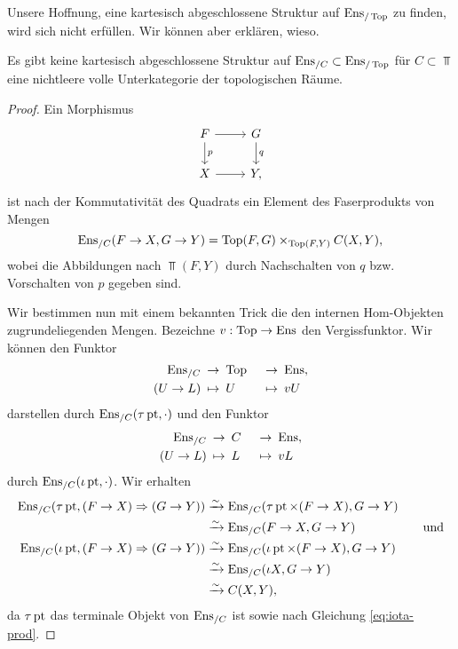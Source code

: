 Unsere Hoffnung, eine kartesisch abgeschlossene Struktur auf
$\operatorname{Ens}_{/\operatorname{Top}}$ zu finden, wird sich nicht erfüllen. Wir können aber
erklären, wieso.

\begin{satz}
  Es gibt keine kartesisch abgeschlossene Struktur auf
  $\operatorname{Ens}_{/C} \subset \operatorname{Ens}_{/\operatorname{Top}}$ für $C \subset \Top$ eine
  nichtleere volle Unterkategorie der topologischen Räume.
\end{satz}
\begin{proof}


  Ein Morphismus
  \[ \begin{tikzcd}
    F \arrow[r] \dar{p} & G \dar{q} \\
    X \arrow[r] & Y,
  \end{tikzcd} \]
  ist nach der Kommutativität des Quadrats ein Element des
  Faserprodukts von Mengen
  \[ \operatorname{Ens}_{/C}(F \to X, G \to Y) = \operatorname{Top}(F, G) \times_{\operatorname{Top}(F, Y)} C(X, Y), \]
  wobei die Abbildungen nach $\Top(F, Y)$ durch Nachschalten von $q$
  bzw. Vorschalten von $p$ gegeben sind.

  Wir bestimmen nun mit einem bekannten Trick die den internen
  Hom-Objekten zugrundeliegenden Mengen. Bezeichne $v: \operatorname{Top} \to \operatorname{Ens}$
  den Vergissfunktor. Wir können den Funktor
  \begin{alignat*}{2}
    \operatorname{Ens}_{/C} \: &\to \: \operatorname{Top} \: &&\to \: \operatorname{Ens}, \\
    (U \to L) \: &\mapsto \: U \: &&\mapsto \: vU
  \end{alignat*}
  darstellen durch $\operatorname{Ens}_{/C}(\tau \operatorname{pt}, \cdot)$
  und den Funktor
  \begin{alignat*}{2}
    \operatorname{Ens}_{/C} \: &\to \: C \: &&\to \: \operatorname{Ens}, \\
    (U \to L) \: &\mapsto \: L \: &&\mapsto \: vL
  \end{alignat*}
  durch $\operatorname{Ens}_{/C}(\iota \operatorname{pt}, \cdot)$. Wir erhalten
  \begin{align*}
    \operatorname{Ens}_{/C}(\tau \operatorname{pt}, (F \to X) \Rightarrow (G \to Y))
    &\xrightarrow[]{\sim} \operatorname{Ens}_{/C}(\tau \operatorname{pt} \times (F \to X), G \to Y) \quad & \\
    &\xrightarrow[]{\sim} \operatorname{Ens}_{/C}(F \to X, G \to Y) & \text{und} \\
    \operatorname{Ens}_{/C}(\iota \operatorname{pt}, (F \to X) \Rightarrow (G \to Y))
    &\xrightarrow[]{\sim} \operatorname{Ens}_{/C}(\iota \operatorname{pt} \times (F \to X), G \to Y) \\
    &\xrightarrow[]{\sim} \operatorname{Ens}_{/C}(\iota X, G \to Y) \\
    &\xrightarrow[]{\sim} C(X, Y),
  \end{align*}
  da $\tau \operatorname{pt}$ das terminale Objekt von $\operatorname{Ens}_{/C}$ ist sowie nach
  Gleichung \ref{eq:iota-prod}.


\end{proof}
